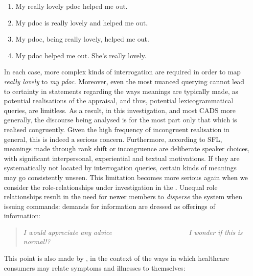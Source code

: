 \begin{multicols}{2}
\begin{enumerate}
\footnotesize
\setlength\itemsep{-0.5em}
\item My really lovely pdoc helped me out. %
\item My pdoc is really lovely and helped me out. %
\item My pdoc, being really lovely, helped me out. %
\item My pdoc helped me out. She's really lovely. %
\end{enumerate}
\end{multicols}
%
\noindent In each case, more complex kinds of interrogation are required in order to map \emph{really lovely} to \emph{my pdoc}. Moreover, even the most nuanced querying cannot lead to certainty in statements regarding the ways meanings are typically made, as potential realisations of the appraisal, and thus, potential lexicogrammatical queries, are limitless. As a result, in this investigation, and most \gls{CADS} more generally, the discourse being analysed is for the most part only that which is realised congruently. Given the high frequency of incongruent realisation in general, this is indeed a serious concern. Furthermore, according to \gls{SFL}, meanings made through rank shift or incongruence are deliberate speaker choices, with significant interpersonal, experiential and textual motivations. If they are systematically not located by interrogation queries, certain kinds of meanings may go consistently unseen. This limitation becomes more serious again when we consider the role\hyp{}relationships under investigation in the . Unequal role relationships result in the need for newer \glspl{member} to \emph{disperse} the  system when issuing commands: demands for information are dressed as offerings of information:

\begin{quote}
\emph{I would appreciate any advice~~~~~~~~~~~~~~~~~~~~~~I wonder if this is normal!?}
\end{quote}

This point is also made by \textcite{slade_emergency_2008}, in the context of the ways in which healthcare consumers may relate symptoms and illnesses to themselves:


